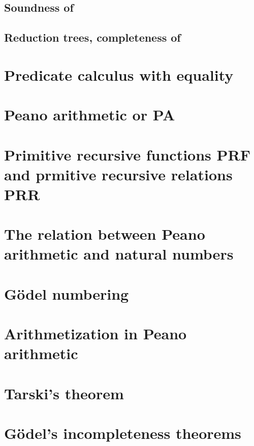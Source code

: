 \documentclass[11pt,a4paper]{article}
\begin{document}
\subsection{Soundness of \LK}

\subsection{Reduction trees, completeness of \LK}

\section{Predicate calculus with equality}

\section{Peano arithmetic or PA}

\section{Primitive recursive functions PRF and prmitive recursive relations PRR}

\section{The relation between Peano arithmetic and natural numbers}

\section{Gödel numbering}

\section{Arithmetization in Peano arithmetic}

\section{Tarski's theorem}

\section{Gödel's incompleteness theorems}

{\raggedright%
\printbibliography[heading=bibintoc]%
}
\end{document}
